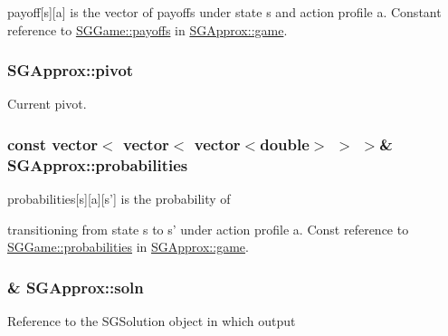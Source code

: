 payoff\mbox{[}s\mbox{]}\mbox{[}a\mbox{]} is the vector of payoffs under state s and action profile a. Constant reference to \hyperlink{classSGGame_aad28dd39c6359e772286a938a948634c}{S\-G\-Game\-::payoffs} in \hyperlink{classSGApprox_a0774e3ed0ff009809606a42c9e7ef727}{S\-G\-Approx\-::game}. \hypertarget{classSGApprox_a037c73ff2b6ff8a55fadf57bb0a6a546}{
\subsubsection[{pivot}]{ S\-G\-Approx\-::pivot\hspace{0.3cm}{\ttfamily [private]}}}\label{classSGApprox_a037c73ff2b6ff8a55fadf57bb0a6a546}
Current pivot. \hypertarget{classSGApprox_aaedd93c6e7faddcf4f33fceec383c562}{
\subsubsection[{probabilities}]{\setlength{\rightskip}{0pt plus 5cm}const vector$<$ vector$<$ vector$<$double$>$ $>$ $>$\& S\-G\-Approx\-::probabilities\hspace{0.3cm}{\ttfamily [private]}}}\label{classSGApprox_aaedd93c6e7faddcf4f33fceec383c562}
\begin{DoxyVerb}      probabilities[s][a][s'] is the probability of
\end{DoxyVerb}
 transitioning from state s to s' under action profile a. Const reference to \hyperlink{classSGGame_a167a281b11d524cb4a11dbaff3e9de68}{S\-G\-Game\-::probabilities} in \hyperlink{classSGApprox_a0774e3ed0ff009809606a42c9e7ef727}{S\-G\-Approx\-::game}. \hypertarget{classSGApprox_aaed7d16ba723bbdfbec94b21e0edff8e}{
\subsubsection[{soln}]{\& S\-G\-Approx\-::soln\hspace{0.3cm}{\ttfamily [private]}}}\label{classSGApprox_aaed7d16ba723bbdfbec94b21e0edff8e}
\begin{DoxyVerb} Reference to the SGSolution object in which output
\end{DoxyVerb}
